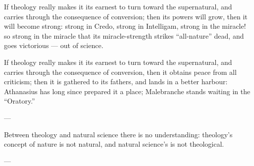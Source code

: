\documentclass[12pt,a4paper]{article}
\begin{document}
If theology really makes it its earnest to turn toward the supernatural, and carries
through the consequence of conversion; then its powers will grow, then it will
become strong: strong in Credo, strong in Intelligam, strong in the miracle! so
strong in the miracle that its miracle-strength strikes ``all-nature'' dead, and
goes victorious --- out of science.

If theology really makes it its earnest to turn toward the supernatural, and carries
through the consequence of conversion, then it obtains peace from all criticism;
then it is gathered to its fathers, and lands in a better harbour: Athanasius has
long since prepared it a place; Malebranche stands waiting in the ``Oratory.''

\begin{center}---\end{center}

Between theology and natural science there is no understanding: theology's concept
of nature is not natural, and natural science's is not theological.

\begin{center}---\end{center}

\end{document}
